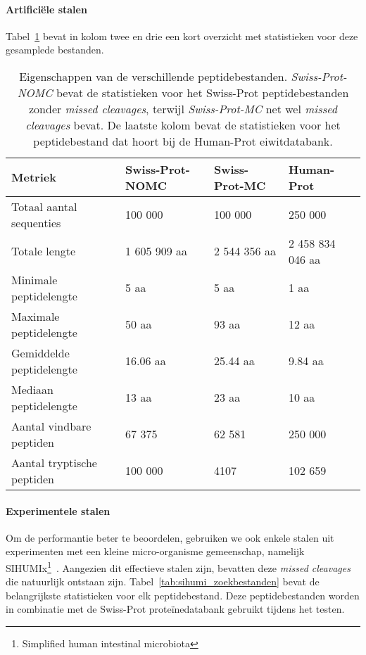 \paragraph{Artificiële stalen}
Tabel~\ref{tab:artifiele_bestanden_statistieken} bevat in kolom twee en drie een kort overzicht met statistieken voor deze gesamplede bestanden.

\begin{table}[H]
    \centering
    \begin{tabular}{l l l l}
        Metriek                    & Swiss-Prot-NOMC & Swiss-Prot-MC & Human-Prot       \\
        \hline\hline
        Totaal aantal sequenties   & 100 000         & 100 000       & 250 000          \\
        Totale lengte              & 1 605 909 aa    & 2 544 356 aa  & 2 458 834 046 aa \\
        Minimale peptidelengte     & 5 aa            & 5 aa          & 1 aa             \\
        Maximale peptidelengte     & 50 aa           & 93 aa         & 12 aa            \\
        Gemiddelde peptidelengte   & 16.06 aa        & 25.44 aa      & 9.84 aa          \\
        Mediaan peptidelengte      & 13 aa           & 23 aa         & 10 aa            \\
        Aantal vindbare peptiden   & 67 375          & 62 581        & 250 000          \\
        Aantal tryptische peptiden & 100 000         & 4107          & 102 659          \\
        \hline
    \end{tabular}
    \caption{Eigenschappen van de verschillende peptidebestanden. \textit{Swiss-Prot-NOMC} bevat de statistieken voor het Swiss-Prot peptidebestanden zonder \textit{missed cleavages}, terwijl \textit{Swiss-Prot-MC} net wel \textit{missed cleavages} bevat. De laatste kolom bevat de statistieken voor het peptidebestand dat hoort bij de Human-Prot eiwitdatabank.}
    \label{tab:artifiele_bestanden_statistieken}
\end{table}

\paragraph{Experimentele stalen}
Om de performantie beter te beoordelen, gebruiken we ook enkele stalen uit experimenten met een kleine micro-organisme gemeenschap, namelijk SIHUMIx\footnote{Simplified human intestinal microbiota}~\cite{SIHUMI_first_introduction, SIHUMI_frequently_used}.
Aangezien dit effectieve stalen zijn, bevatten deze \textit{missed cleavages} die natuurlijk ontstaan zijn.
Tabel~\ref{tab:sihumi_zoekbestanden} bevat de belangrijkste statistieken voor elk peptidebestand.
Deze peptidebestanden worden in combinatie met de Swiss-Prot proteïnedatabank gebruikt tijdens het testen.

